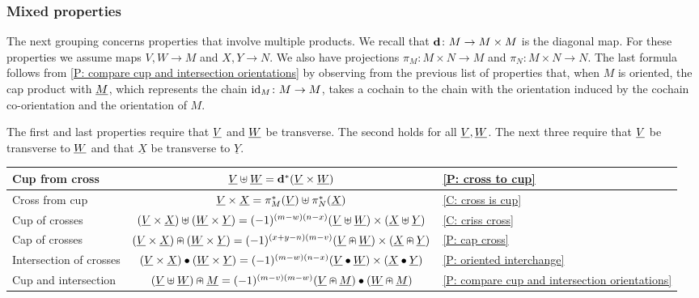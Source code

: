 \subsubsection{Mixed properties}\label{S: mixed formulas}

The next grouping concerns properties that involve multiple products. We recall that $\mathbf{d} \colon M \to M \times M$ is the diagonal map. For these properties we assume maps $V,W \to M$ and $X,Y \to N$. We also have projections $\pi_M \colon M \times N \to M$ and $\pi_N \colon M \times N \to N$. The last formula follows from \cref{P: compare cup and intersection orientations} by observing from the previous list of properties that, when $M$ is oriented, the cap product with $\underline{M}$, which represents the chain $\mathrm{id}_M \colon M \to M$, takes a cochain to the chain with the orientation induced by the cochain co-orientation and the orientation of $M$.

The first and last properties require that $\underline{V}$ and $\underline{W}$ be transverse. The second holds for all $\underline{V}, \underline{W}$. The next three require that $\underline{V}$ be transverse to $\underline{W}$ and that $\underline{X}$ be transverse to $\underline{Y}$.

\bigskip

\begin{minipage}{\linewidth}
\centering

\begin{tabular}{|l|c|l|}
\hline
Cup from cross& $\underline{V}\uplus \underline{W} = \mathbf{d}^*(\underline{V} \times \underline{W})$&\cref{P: cross to cup}	\\
\hline
Cross from cup&$\underline{V} \times \underline{X} = \pi_M^*(\underline{V})\uplus\pi_N^*(\underline{X})$& \cref{C: cross is cup}	\\
\hline
Cup of crosses&$(\underline{V} \times \underline{X})\uplus (\underline{W} \times \underline{Y}) = (-1)^{(m-w)(n-x)} (\underline{V}\uplus \underline{W}) \times (\underline{X}\uplus \underline{Y})$ &	\cref{C: criss cross}\\
\hline
Cap of crosses &$(\underline{V} \times \underline{X})\nplus (\underline{W} \times \underline{Y}) = (-1)^{(x+y-n)(m-v)} (\underline{V} \nplus \underline{W}) \times (\underline{X}\nplus \underline{Y})$ & \cref{P: cap cross}\\
\hline
Intersection of crosses &$(\underline{V} \times \underline{X})\bullet (\underline{W} \times \underline{Y}) = (-1)^{(m-w)(n-x)}(\underline{V}\bullet \underline{W}) \times (\underline{X}\bullet \underline{Y})$&\cref{P: oriented interchange}\\
\hline
Cup and intersection &$(\underline{V}\uplus \underline{W})\nplus \underline{M} = (-1)^{(m-v)(m-w)}(\underline{V}\nplus \underline{M})\bullet(\underline{W}\nplus \underline{M})$&\cref{P: compare cup and intersection orientations}\\
\hline
\end{tabular}
\end{minipage}

